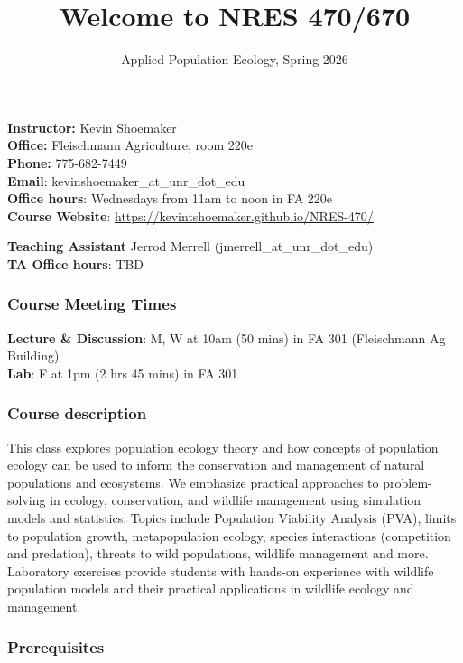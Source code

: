 \documentclass[
]{article}
\title{Welcome to NRES 470/670}
\author{Applied Population Ecology, Spring 2026}
\date{}
\begin{document}
\maketitle

\textbf{Instructor:} Kevin Shoemaker\\
\textbf{Office:} Fleischmann Agriculture, room 220e\\
\textbf{Phone:} 775-682-7449\\
\textbf{Email}: kevinshoemaker\_at\_unr\_dot\_edu\\
\textbf{Office hours}: Wednesdays from 11am to noon in FA 220e\\
\textbf{Course Website}:
\url{https://kevintshoemaker.github.io/NRES-470/}

\textbf{Teaching Assistant} Jerrod Merrell
(jmerrell\_at\_unr\_dot\_edu)\\
\textbf{TA Office hours}: TBD

\subsubsection{Course Meeting Times}\label{course-meeting-times}

\textbf{Lecture \& Discussion}: M, W at 10am (50 mins) in FA 301
(Fleischmann Ag Building)\\
\textbf{Lab}: F at 1pm (2 hrs 45 mins) in FA 301

\subsubsection{Course description}\label{course-description}

This class explores population ecology theory and how concepts of
population ecology can be used to inform the conservation and management
of natural populations and ecosystems. We emphasize practical approaches
to problem-solving in ecology, conservation, and wildlife management
using simulation models and statistics. Topics include Population
Viability Analysis (PVA), limits to population growth, metapopulation
ecology, species interactions (competition and predation), threats to
wild populations, wildlife management and more. Laboratory exercises
provide students with hands-on experience with wildlife population
models and their practical applications in wildlife ecology and
management.

\subsubsection{Prerequisites}\label{prerequisites}
\end{document}
